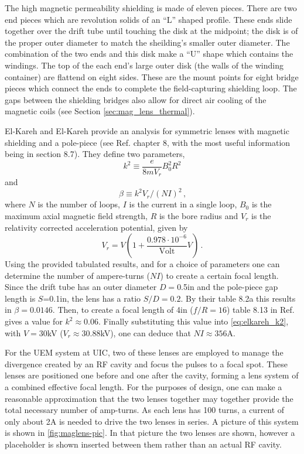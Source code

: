 The high magnetic permeability shielding is made of eleven pieces.
There are two end pieces which are revolution solids of an ``L'' shaped profile.
These ends slide together over the drift tube until touching the disk at the midpoint; the disk is of the proper outer diameter to match the sheilding's smaller outer diameter.
The combination of the two ends and this disk make a ``U'' shape which contains the windings.
The top of the each end's large outer disk (the walls of the winding container) are flattend on eight sides.
These are the mount points for eight bridge pieces which connect the ends to complete the field-capturing shielding loop.
The gaps between the shielding bridges also allow for direct air cooling of the magnetic coils (see Section \ref{sec:mag_lens_thermal}).

El-Kareh and El-Kareh provide an analysis for symmetric lenses with magnetic shielding and a pole-piece (see Ref. \cite{el-kareh_electron_1970} chapter 8, with the most useful information being in section 8.7).
They define two parameters,
\begin{equation}
  k^2 \equiv \frac{e}{8 m V_r} B_0^2 R^2
\end{equation}
and
\begin{equation} \label{eq:elkareh_k2}
  \beta \equiv k^2 V_r / (NI)^2 \,\text{,}
\end{equation}
where $N$ is the number of loops, $I$ is the current in a single loop, $B_0$ is the maximum axial magnetic field strength, $R$ is the bore radius and $V_r$ is the relativity corrected acceleration potential, given by
\begin{equation}
  V_r = V ( 1 + \frac{0.978 \cdot 10^{-6}}{\text{Volt}} V ) \,\text{.}
\end{equation}
Using the provided tabulated results, and for a choice of parameters one can determine the number of ampere-turns ($NI$) to create a certain focal length.
Since the drift tube has an outer diameter $D=$0.5in and the pole-piece gap length is $S$=0.1in, the lens has a ratio $S/D=0.2$.
By their table 8.2a this results in $\beta=0.0146$.
Then, to create a focal length of 4in ($f/R=16$) table 8.13 in Ref. \cite{el-kareh_electron_1970} gives a value for $k^2 \approx 0.06$.
Finally substituting this value into \ref{eq:elkareh_k2}, with $V=30$kV ($V_r\approx30.88$kV), one can deduce that $NI\approx356$A.

For the UEM system at UIC, two of these lenses are employed to manage the divergence created by an RF cavity and focus the pulses to a focal spot. 
These lenses are positioned one before and one after the cavity, forming a lens system of a combined effective focal length.
For the purposes of design, one can make a reasonable approximation that the two lenses together may together provide the total necessary number of amp-turns.
As each lens has 100 turns, a current of only about 2A is needed to drive the two lenses in series.
A picture of this system is shown in \ref{fig:maglens-pic}.
In that picture the two lenses are shown, however a placeholder is shown inserted between them rather than an actual RF cavity.

